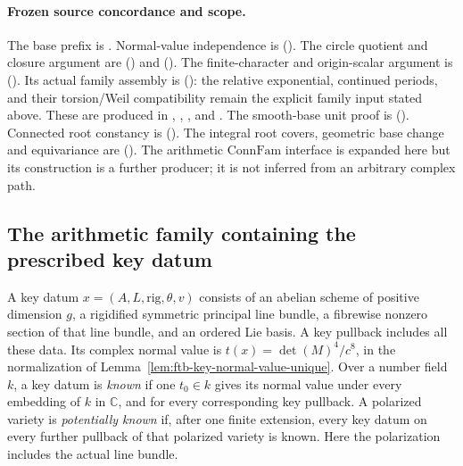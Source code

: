 \paragraph{Frozen source concordance and scope.}
The base prefix is
.
Normal-value independence is
().
The circle quotient and closure argument are
()
and 
().
The finite-character and origin-scalar argument is
().
Its actual family assembly is
():
the relative exponential, continued periods, and their
torsion/Weil compatibility remain the explicit family input
stated above.  These are produced in
,
,
, and
.
The smooth-base unit proof is
().
Connected root constancy is
().
The integral root covers, geometric base change and equivariance
are 
().
The arithmetic \(\mathrm{ConnFam}\) interface is expanded here
but its construction is a further producer; it is not inferred
from an arbitrary complex path.


\subsection{The arithmetic family containing the prescribed key datum}
\label{subsec:ftb-arithmetic-key-family}

A key datum \(x=(A,L,\mathrm{rig},\theta,v)\) consists of an abelian
scheme of positive dimension \(g\), a rigidified symmetric principal
line bundle, a fibrewise nonzero section of that line bundle, and
an ordered Lie basis.  A key pullback includes all these data.
Its complex normal value is \(t(x)=\det(M)^4/c^8\), in the
normalization of Lemma~\ref{lem:ftb-key-normal-value-unique}.
Over a number field \(k\), a key datum is \emph{known} if one
\(t_0\in k\) gives its normal value under every embedding of \(k\)
in \(\mathbb C\), and for every corresponding key pullback.
A polarized variety is \emph{potentially known} if, after one
finite extension, every key datum on every further pullback of
that polarized variety is known.
Here the polarization includes the actual line bundle.

